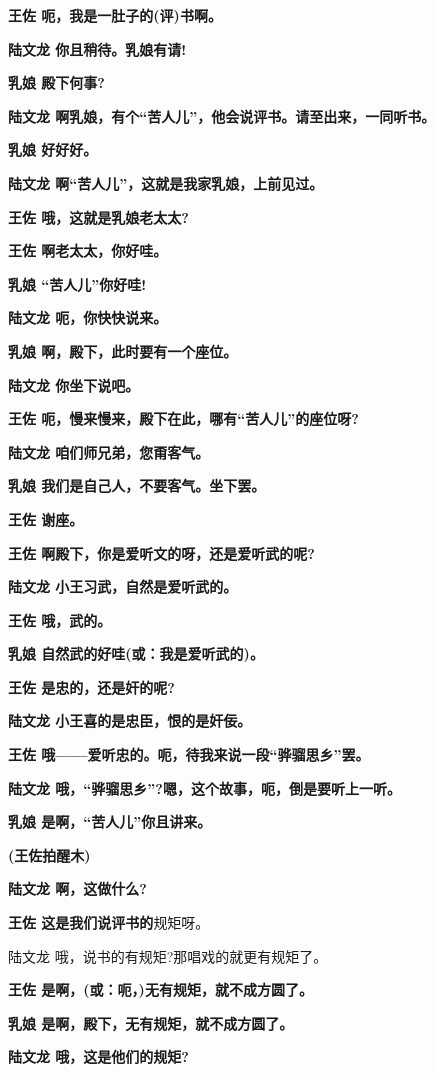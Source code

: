 \textbf{王佐 呃，我是一肚子的(评)书啊。}

\textbf{陆文龙 你且稍待。乳娘有请!}

\textbf{乳娘 殿下何事?}

\textbf{陆文龙 啊乳娘，有个``苦人儿''，他会说评书。请至出来，一同听书。}

\textbf{乳娘 好好好。}

\textbf{陆文龙 啊``苦人儿''，这就是我家乳娘，上前见过。}

\textbf{王佐 哦，这就是乳娘老太太?}

\textbf{王佐 啊老太太，你好哇。}

\textbf{乳娘 ``苦人儿''你好哇!}

\textbf{陆文龙 呃，你快快说来。}

\textbf{乳娘 啊，殿下，此时要有一个座位。}

\textbf{陆文龙 你坐下说吧。}

\textbf{王佐 呃，慢来慢来，殿下在此，哪有``苦人儿''的座位呀?}

\textbf{陆文龙 咱们师兄弟，您甭客气。}

\textbf{乳娘 我们是自己人，不要客气。坐下罢。}

\textbf{王佐 谢座。}

\textbf{王佐 啊殿下，你是爱听文的呀，还是爱听武的呢?}

\textbf{陆文龙 小王习武，自然是爱听武的。}

\textbf{王佐 哦，武的。}

\textbf{乳娘 自然武的好哇(或：我是爱听武的)。}

\textbf{王佐 是忠的，还是奸的呢?}

\textbf{陆文龙 小王喜的是忠臣，恨的是奸佞。}

\textbf{王佐 哦------爱听忠的。呃，待我来说一段``骅骝思乡''罢。}

\textbf{陆文龙 哦，``骅骝思乡''?嗯，这个故事，呃，倒是要听上一听。}

\textbf{乳娘 是啊，``苦人儿''你且讲来。}

\textbf{(王佐拍醒木)}

\textbf{陆文龙 啊，这做什么?}

\textbf{王佐 这是我们说评书的}规矩呀。

陆文龙 哦，说书的有规矩?那唱戏的就更有规矩了。

\textbf{王佐 是啊，(或：呃，)无有规矩，就不成方圆了。}

\textbf{乳娘 是啊，殿下，无有规矩，就不成方圆了。}

\textbf{陆文龙 哦，这是他们的规矩?}

